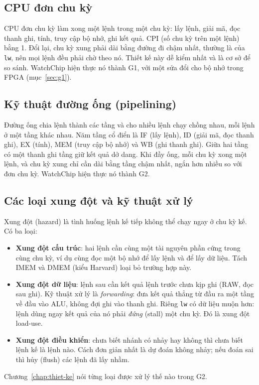 \subsection{CPU đơn chu kỳ}
CPU đơn chu kỳ làm xong một lệnh trong một chu kỳ: lấy lệnh, giải mã, đọc thanh ghi, tính, truy cập bộ nhớ, ghi kết quả. CPI (số chu kỳ trên một lệnh) bằng 1. Đổi lại, chu kỳ xung phải dài bằng đường đi chậm nhất, thường là của \texttt{lw}, nên mọi lệnh đều phải chờ theo nó. Thiết kế này dễ kiểm nhất và là cơ sở để so sánh. WatchChip hiện thực nó thành G1, với một sửa đổi cho bộ nhớ trong FPGA (mục~\ref{sec:g1}).

\subsection{Kỹ thuật đường ống (pipelining)}
Đường ống chia lệnh thành các tầng và cho nhiều lệnh chạy chồng nhau, mỗi lệnh ở một tầng khác nhau. Năm tầng cổ điển là IF (lấy lệnh), ID (giải mã, đọc thanh ghi), EX (tính), MEM (truy cập bộ nhớ) và WB (ghi thanh ghi). Giữa hai tầng có một thanh ghi tầng giữ kết quả dở dang. Khi đầy ống, mỗi chu kỳ xong một lệnh, và chu kỳ xung chỉ cần dài bằng tầng chậm nhất, ngắn hơn nhiều so với đơn chu kỳ. WatchChip hiện thực nó thành G2.

\subsection{Các loại xung đột và kỹ thuật xử lý}
Xung đột (hazard) là tình huống lệnh kế tiếp không thể chạy ngay ở chu kỳ kế. Có ba loại:
\begin{itemize}
  \item \textbf{Xung đột cấu trúc}: hai lệnh cần cùng một tài nguyên phần cứng trong cùng chu kỳ, ví dụ cùng đọc một bộ nhớ để lấy lệnh và để lấy dữ liệu. Tách IMEM và DMEM (kiểu Harvard) loại bỏ trường hợp này.
  \item \textbf{Xung đột dữ liệu}: lệnh sau cần kết quả lệnh trước chưa kịp ghi (RAW, đọc sau ghi). Kỹ thuật xử lý là \emph{forwarding}: đưa kết quả thẳng từ đầu ra một tầng về đầu vào ALU, không đợi ghi vào thanh ghi. Riêng \texttt{lw} có dữ liệu muộn hơn: lệnh dùng ngay kết quả của nó phải \emph{đứng} (stall) một chu kỳ. Đó là xung đột load-use.
  \item \textbf{Xung đột điều khiển}: chưa biết nhánh có nhảy hay không thì chưa biết lệnh kế là lệnh nào. Cách đơn giản nhất là dự đoán không nhảy; nếu đoán sai thì hủy (flush) các lệnh đã lấy nhầm.
\end{itemize}
Chương~\ref{chap:thiet-ke} nói từng loại được xử lý thế nào trong G2.

